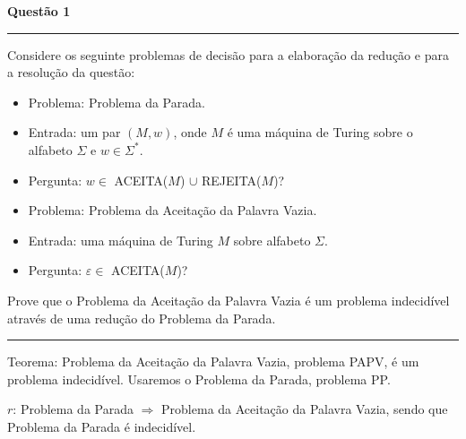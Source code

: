 \documentclass{article}
\begin{document}
\begin{center}

    \vspace*{-11mm}
    \textbf{\large{Questão 1}}
    \vspace*{-4.8mm}

\end{center}

\noindent\rule{\textwidth}{0.5pt}

\bigskip

Considere os seguinte problemas de decisão para a elaboração da redução e para a resolução da questão:

\medskip

\begin{itemize}

    \item Problema: Problema da Parada.
    \item Entrada: um par $(M, w)$, onde $M$ é uma máquina de Turing sobre o alfabeto $\Sigma$ e $w \in \Sigma ^*$.
    \item Pergunta: $w \in$ ACEITA($M$) $\cup$ REJEITA($M$)?
    
\end{itemize}

\medskip

\begin{itemize}

    \item Problema: Problema da Aceitação da Palavra Vazia.
    \item Entrada: uma máquina de Turing $M$ sobre alfabeto $\Sigma$.
    \item Pergunta: $\varepsilon \in$ ACEITA($M$)?
    
\end{itemize}

\medskip

Prove que o Problema da Aceitação da Palavra Vazia é um problema indecidível através de uma redução do Problema da Parada.

\bigskip

\noindent\rule{\textwidth}{0.5pt}

\bigskip

Teorema: Problema da Aceitação da Palavra Vazia, problema PAPV, é um problema indecidível. Usaremos o Problema da Parada, problema PP.

\medskip

$r$: Problema da Parada $\Longrightarrow$ Problema da Aceitação da Palavra Vazia, sendo que Problema da Parada é indecidível.
\end{document}
